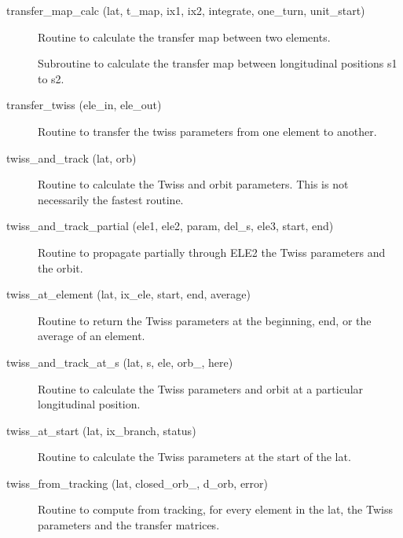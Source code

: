 \begin{description}
\label{r:transfer.map.calc}
\item[transfer_map_calc (lat, t_map, ix1, ix2, integrate, one_turn, unit_start) ] \Newline 
Routine to calculate the transfer map between two elements.

\label{r:transfer.map.from.s.to.s}
\item[\protect\parbox{6in}{
    transfer_map_from_s_to_s (lat, t_map, s1, s2, ix_branch, integrate, \\
    \hspace*{1in} one_turn, unit_start, err_flag) }] \Newline 
Subroutine to calculate the transfer map between longitudinal positions
s1 to s2.

\label{r:transfer.twiss}
\item[transfer_twiss (ele_in, ele_out)] \Newline 
Routine to transfer the twiss parameters from one element to another.

\item[twiss_and_track (lat, orb)] \Newline
Routine to calculate the Twiss and orbit parameters. 
This is not necessarily the fastest routine. 

\item[twiss_and_track_partial (ele1, ele2, param, del_s, ele3, start, end)] \Newline
Routine to propagate partially through ELE2 the Twiss parameters and the orbit. 

\label{r:twiss.at.element}
\item[twiss_at_element (lat, ix_ele, start, end, average)] \Newline
Routine to return the Twiss parameters at the beginning, end, or the average of an element. 

\item[twiss_and_track_at_s (lat, s, ele, orb_, here)] \Newline
Routine to calculate the Twiss parameters and orbit at a particular longitudinal position. 

\label{r:twiss.at.start}
\item[twiss_at_start (lat, ix_branch, status)] \Newline
Routine to calculate the Twiss parameters at the start of the lat. 

\label{r:twiss.from.tracking}
\item[twiss_from_tracking (lat, closed_orb_, d_orb, error)] \Newline
Routine to compute from tracking, for every element in the lat, 
the Twiss parameters and the transfer matrices. 


\end{description}
